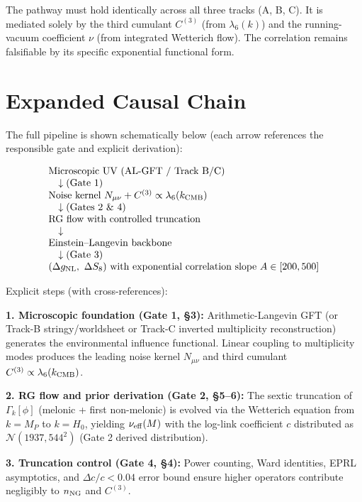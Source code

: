 \documentclass[12pt]{article}
\begin{document}
The pathway must hold identically across all three tracks (A, B, C). It is mediated solely by the third cumulant \(C^{(3)}\) (from \(\lambda_6(k)\)) and the running-vacuum coefficient \(\nu\) (from integrated Wetterich flow). The correlation remains falsifiable by its specific exponential functional form.

\section{Expanded Causal Chain}
The full pipeline is shown schematically below (each arrow references the responsible gate and explicit derivation):

\[
\begin{array}{l}
\text{Microscopic UV (AL-GFT / Track B/C)} \\
\quad \downarrow \text{(Gate 1)} \\
\text{Noise kernel } N_{\mu\nu} + C^{(3)} \propto \lambda_6(k_{\rm CMB}) \\
\quad \downarrow \text{(Gates 2 \& 4)} \\
\text{RG flow with controlled truncation} \\
\quad \downarrow \\
\text{Einstein–Langevin backbone} \\
\quad \downarrow \text{(Gate 3)} \\
(\Delta g_{\rm NL},\ \Delta S_8)\ \text{with exponential correlation slope } A \in [200,500]
\end{array}
\]

Explicit steps (with cross-references):

\noindent
\textbf{1. Microscopic foundation (Gate 1, §3):} Arithmetic-Langevin GFT (or Track-B stringy/worldsheet or Track-C inverted multiplicity reconstruction) generates the environmental influence functional. Linear coupling to multiplicity modes produces the leading noise kernel \(N_{\mu\nu}\) and third cumulant \(C^{(3)} \propto \lambda_6(k_{\rm CMB})\).

\noindent
\textbf{2. RG flow and prior derivation (Gate 2, §5–6):} The sextic truncation of \(\Gamma_k[\phi]\) (melonic + first non-melonic) is evolved via the Wetterich equation from \(k = M_P\) to \(k = H_0\), yielding \(\nu_{\rm eff}(M)\) with the log-link coefficient \(c\) distributed as \(\mathcal{N}(1937, 544^2)\) (Gate 2 derived distribution).

\noindent
\textbf{3. Truncation control (Gate 4, §4):} Power counting, Ward identities, EPRL asymptotics, and \(\Delta c/c < 0.04\) error bound ensure higher operators contribute negligibly to \(n_{\rm NG}\) and \(C^{(3)}\).
\end{document}
